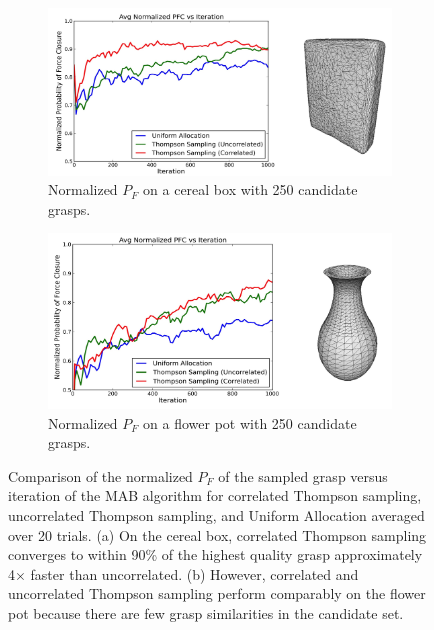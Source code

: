 \begin{figure}[t!]
\centering
	\begin{subfigure}[b]{0.5\textwidth}
        \centering
        \includegraphics[scale=0.08]{figures/box_avg_reward_w_model.jpg}
        \caption{Normalized $P_F$ on a cereal box with 250 candidate grasps.}
    \end{subfigure}
    \begin{subfigure}[b]{0.5\textwidth}
        \centering
        \includegraphics[scale=0.08]{figures/flowerpot_avg_reward_w_model.jpg}
        \caption{Normalized $P_F$ on a flower pot with 250 candidate grasps.}
    \end{subfigure}
\caption{Comparison of the normalized $P_F$ of the sampled grasp versus iteration of the MAB algorithm for correlated Thompson sampling, uncorrelated Thompson sampling, and Uniform Allocation averaged over 20 trials. (a) On the cereal box, correlated Thompson sampling converges to within 90\% of the highest quality grasp approximately 4$\times$ faster than uncorrelated. (b) However, correlated and uncorrelated Thompson sampling perform comparably on the flower pot because there are few grasp similarities in the candidate set. }
\vspace*{-15pt}
\end{figure}

